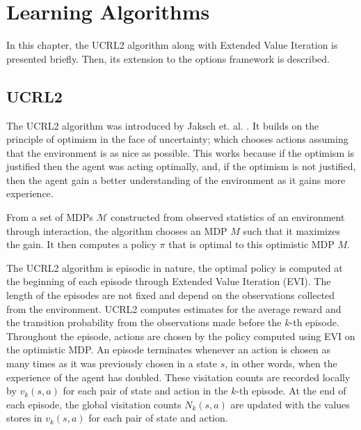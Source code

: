 \chapter{Learning Algorithms}

In this chapter, the UCRL2 algorithm along with Extended Value Iteration is presented briefly.
Then, its extension to the options framework is described.

\section{UCRL2}

The UCRL2 algorithm was introduced by Jaksch et. al. \cite{jaksch_near-optimal_2010}.
It builds on the principle of optimism in the face of uncertainty; which chooses actions assuming that the environment is as nice as possible.
This works because if the optimism is justified then the agent was acting optimally, and, if the optimism is not justified, then the agent gain a better understanding of the environment as it gains more experience.

From a set of MDPs $\mathcal{M}$ constructed from observed statistics of an environment through interaction, the algorithm chooses an MDP $M$ such that it maximizes the gain.
It then computes a policy $\pi$ that is optimal to this optimistic MDP $M$.

The UCRL2 algorithm is episodic in nature, the optimal policy is computed at the beginning of each episode through Extended Value Iteration (EVI).
The length of the episodes are not fixed and depend on the observations collected from the environment.
UCRL2 computes estimates for the average reward and the transition probability from the observations made before the $k$-th episode.
Throughout the episode, actions are chosen by the policy computed using EVI on the optimistic MDP.
An episode terminates whenever an action is chosen as many times as it was previously chosen in a state $s$, in other words, when the experience of the agent has doubled.
These visitation counts are recorded locally by $v_k(s, a)$ for each pair of state and action in the $k$-th episode.
At the end of each episode, the global visitation counts $N_k(s,a)$ are updated with the values stores in $v_k(s, a)$ for each pair of state and action.

